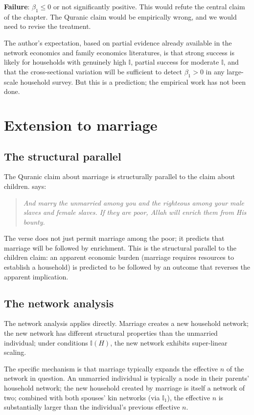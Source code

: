\textbf{Failure}: $\beta_1 \leq 0$ or not significantly positive.
This would refute the central claim of the chapter. The Quranic
claim would be empirically wrong, and we would need to revise the
treatment.

The author's expectation, based on partial evidence already
available in the network economics and family economics
literatures, is that strong success is likely for households with
genuinely high $\mathbb{I}$, partial success for moderate
$\mathbb{I}$, and that the cross-sectional variation will be
sufficient to detect $\beta_1 > 0$ in any large-scale household
survey. But this is a prediction; the empirical work has not been
done.

\section{Extension to marriage}
\label{sec:network-marriage}

\subsection{The structural parallel}

The Quranic claim about marriage is structurally parallel to the
claim about children.  says:

\begin{quote}
\textit{And marry the unmarried among you and the righteous among
your male slaves and female slaves. If they are poor, Allah will
enrich them from His bounty.}
\end{quote}

The verse does not just permit marriage among the poor; it
predicts that marriage will be followed by enrichment. This is the
structural parallel to the children claim: an apparent economic
burden (marriage requires resources to establish a household) is
predicted to be followed by an outcome that reverses the apparent
implication.

\subsection{The network analysis}

The network analysis applies directly. Marriage creates a new
household network; the new network has different structural
properties than the unmarried individual; under conditions
$\mathbb{I}(H)$, the new network exhibits super-linear scaling.

The specific mechanism is that marriage typically expands the
effective $n$ of the network in question. An unmarried individual
is typically a node in their parents' household network; the new
household created by marriage is itself a network of two; combined
with both spouses' kin networks (via $\mathbb{I}_1$), the effective
$n$ is substantially larger than the individual's previous
effective $n$.

